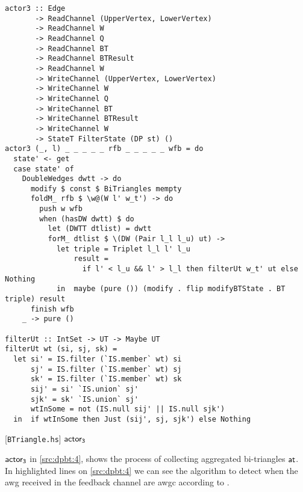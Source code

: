 \begin{listing}[htp!]
\begin{verbatim}      
actor3 :: Edge
       -> ReadChannel (UpperVertex, LowerVertex)
       -> ReadChannel W
       -> ReadChannel Q
       -> ReadChannel BT
       -> ReadChannel BTResult
       -> ReadChannel W
       -> WriteChannel (UpperVertex, LowerVertex)
       -> WriteChannel W
       -> WriteChannel Q
       -> WriteChannel BT
       -> WriteChannel BTResult
       -> WriteChannel W
       -> StateT FilterState (DP st) ()
actor3 (_, l) _ _ _ _ _ rfb _ _ _ _ _ wfb = do
  state' <- get
  case state' of
    DoubleWedges dwtt -> do
      modify $ const $ BiTriangles mempty
      foldM_ rfb $ \w@(W l' w_t') -> do
        push w wfb
        when (hasDW dwtt) $ do
          let (DWTT dtlist) = dwtt
          forM_ dtlist $ \(DW (Pair l_l l_u) ut) ->
            let triple = Triplet l_l l' l_u
                result =
                  if l' < l_u && l' > l_l then filterUt w_t' ut else Nothing
            in  maybe (pure ()) (modify . flip modifyBTState . BT triple) result
      finish wfb
    _ -> pure ()

filterUt :: IntSet -> UT -> Maybe UT
filterUt wt (si, sj, sk) =
  let si' = IS.filter (`IS.member` wt) si 
      sj' = IS.filter (`IS.member` wt) sj
      sk' = IS.filter (`IS.member` wt) sk
      sij' = si' `IS.union` sj'
      sjk' = sk' `IS.union` sj'
      wtInSome = not (IS.null sij' || IS.null sjk')
  in  if wtInSome then Just (sij', sj, sjk') else Nothing
\end{verbatim}
\caption{[\texttt{BTriangle.hs}] $\ac$}
\label{src:dpbt:4}
\end{listing}

$\mathsf{actor_3}$ in \autoref{src:dpbt:4}, shows the process of collecting aggregated bi-triangles $\mathsf{at}$. In highlighted lines on \autoref{src:dpbt:4} we can see the algorithm to detect when the \acrshort{awg}
received in the feedback channel are \acrshort{awgc} according to .


